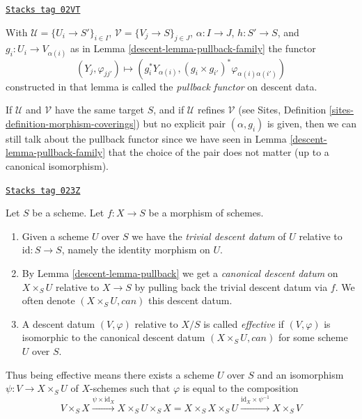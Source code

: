 \begin{definition}
\label{descent-definition-pullback-functor-family}
\href{https://stacks.math.columbia.edu/tag/02VT}{\texttt{Stacks tag 02VT}}

With $\mathcal{U} = \{U_i \to S'\}_{i \in I}$,
$\mathcal{V} = \{V_j \to S\}_{j \in J}$, $\alpha : I \to J$, $h : S' \to S$,
and $g_i : U_i \to V_{\alpha(i)}$ as in Lemma \ref{descent-lemma-pullback-family}
the functor
$$
(Y_j, \varphi_{jj'}) \longmapsto
(g_i^*Y_{\alpha(i)}, (g_i \times g_{i'})^*\varphi_{\alpha(i)\alpha(i')})
$$
constructed in that lemma
is called the {\it pullback functor} on descent data.
\end{definition}

If $\mathcal{U}$ and $\mathcal{V}$ have the same target $S$,
and if $\mathcal{U}$ refines $\mathcal{V}$ (see
Sites, Definition \ref{sites-definition-morphism-coverings})
but no explicit pair $(\alpha, g_i)$ is given, then we can still
talk about the pullback functor since we have seen in
Lemma \ref{descent-lemma-pullback-family} that the choice of the pair does not matter
(up to a canonical isomorphism).


\begin{definition}[Effective]
\label{descent-definition-effective}
\href{https://stacks.math.columbia.edu/tag/023Z}{\texttt{Stacks tag 023Z}}

Let $S$ be a scheme.
Let $f : X \to S$ be a morphism of schemes.
\begin{enumerate}
\item  Given a scheme $U$ over $S$ we have the
{\it trivial descent datum} of $U$ relative to
$\text{id} : S \to S$, namely the identity morphism on $U$.
\item By Lemma \ref{descent-lemma-pullback} we get a
{\it canonical descent datum} on $X \times_S U$
relative to $X \to S$ by pulling back the trivial
descent datum via $f$. We often
denote $(X \times_S U, can)$ this descent datum.
\item A descent datum $(V, \varphi)$ relative to $X/S$ is
called {\it effective} if $(V, \varphi)$
is isomorphic to the canonical descent datum
$(X \times_S U, can)$ for some scheme $U$ over $S$.
\end{enumerate}
\end{definition}

Thus being effective means there exists a scheme $U$
over $S$ and an isomorphism $\psi : V \to X \times_S U$
of $X$-schemes such that $\varphi$ is equal to the composition
$$
V \times_S X \xrightarrow{\psi \times \text{id}_X}
X \times_S U \times_S X =
X \times_S X \times_S U
\xrightarrow{\text{id}_X \times \psi^{-1}}
X \times_S V
$$

